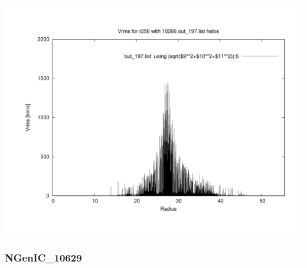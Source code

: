 \includegraphics[scale=0.3]{r256/h100/mm_h/plot_Vrms_out_197.pdf}

% 
%
%
%
%
%
%
%


\newpage

\subsubsection{NGenIC\_10629}

